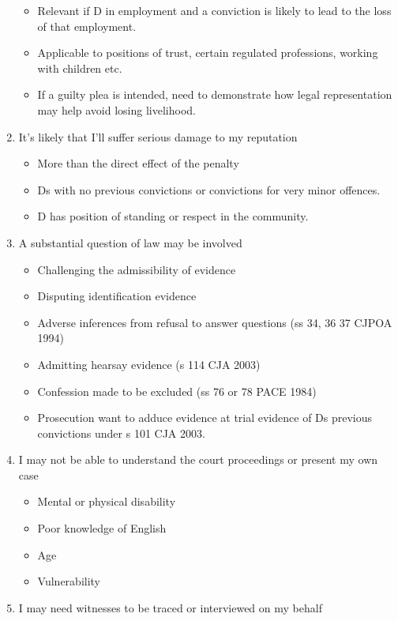 \documentclass[
]{article}
\providecommand{\tightlist}{%
  \setlength{\itemsep}{0pt}\setlength{\parskip}{0pt}}
\begin{document}
\begin{enumerate}
  \begin{itemize}
  \tightlist
  \item
    Relevant if D in employment and a conviction is likely to lead to
    the loss of that employment.
  \item
    Applicable to positions of trust, certain regulated professions,
    working with children etc.
  \item
    If a guilty plea is intended, need to demonstrate how legal
    representation may help avoid losing livelihood.
  \end{itemize}
\item
  It's likely that I'll suffer serious damage to my reputation

  \begin{itemize}
  \tightlist
  \item
    More than the direct effect of the penalty
  \item
    Ds with no previous convictions or convictions for very minor
    offences.
  \item
    D has position of standing or respect in the community.
  \end{itemize}
\item
  A substantial question of law may be involved

  \begin{itemize}
  \tightlist
  \item
    Challenging the admissibility of evidence
  \item
    Disputing identification evidence
  \item
    Adverse inferences from refusal to answer questions (ss 34, 36 37
    CJPOA 1994)
  \item
    Admitting hearsay evidence (s 114 CJA 2003)
  \item
    Confession made to be excluded (ss 76 or 78 PACE 1984)
  \item
    Prosecution want to adduce evidence at trial evidence of Ds previous
    convictions under s 101 CJA 2003.
  \end{itemize}
\item
  I may not be able to understand the court proceedings or present my
  own case

  \begin{itemize}
  \tightlist
  \item
    Mental or physical disability
  \item
    Poor knowledge of English
  \item
    Age
  \item
    Vulnerability
  \end{itemize}
\item
  I may need witnesses to be traced or interviewed on my behalf


\end{enumerate}
\end{document}
